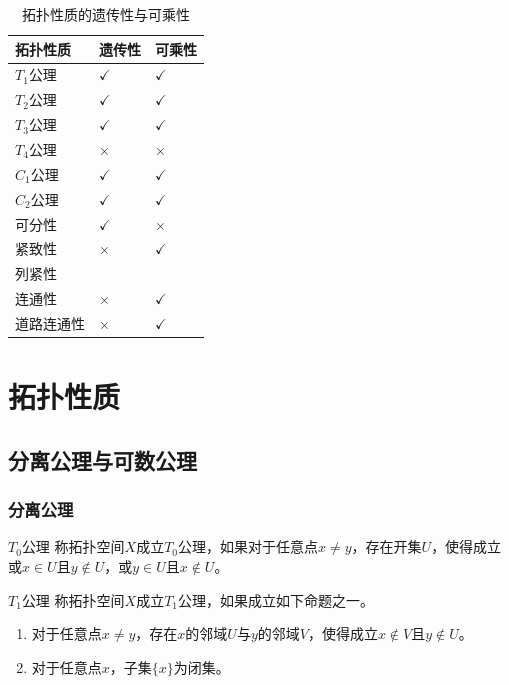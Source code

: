 \documentclass[lang = cn, scheme = chinese, thmcnt = section, usesamecnt]{elegantbook}
\begin{document}
\begin{table}[H]
	\centering
	\caption{拓扑性质的遗传性与可乘性}
	\renewcommand{\arraystretch}{1.25}
	\begin{tabular}{>{\centering\arraybackslash}m{2cm}>{\centering\arraybackslash}m{2cm}>{\centering\arraybackslash}m{2cm}}
		\toprule
		\textbf{拓扑性质} & \textbf{遗传性} & \textbf{可乘性} \\
		\midrule
		$T_1$公理 & $\checkmark$ & $\checkmark$ \\
		$T_2$公理 & $\checkmark$ & $\checkmark$ \\
		$T_3$公理 & $\checkmark$ & $\checkmark$ \\
		$T_4$公理 & $\times$     & $\times$     \\
		$C_1$公理 & $\checkmark$ & $\checkmark$ \\
		$C_2$公理 & $\checkmark$ & $\checkmark$ \\
		可分性    & $\checkmark$ & $\times$   \\
		紧致性    & $\times$     & $\checkmark$ \\
		列紧性    &              &              \\
		连通性    & $\times$     & $\checkmark$ \\
		道路连通性    & $\times$     & $\checkmark$ \\
		\bottomrule
	\end{tabular}
\end{table}

\chapter{拓扑性质}

\section{分离公理与可数公理}

\subsection{分离公理}

\begin{definition}{$T_0$公理}
	称拓扑空间$X$成立$T_0$公理，如果对于任意点$x\ne y$，存在开集$U$，使得成立或$x\in U$且$y\notin U$，或$y\in U$且$x\notin U$。
\end{definition}

\begin{definition}{$T_1$公理}
	称拓扑空间$X$成立$T_1$公理，如果成立如下命题之一。
	\begin{enumerate}
		\item 对于任意点$x\ne y$，存在$x$的邻域$U$与$y$的邻域$V$，使得成立$x\notin V$且$y\notin U$。
		\item 对于任意点$x$，子集$\{x\}$为闭集。
	\end{enumerate}
\end{definition}
\end{document}
